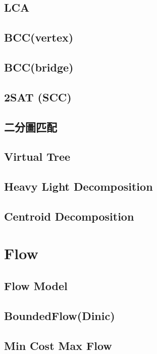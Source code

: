 \subsection{LCA}

\subsection{BCC(vertex)}

\subsection{BCC(bridge)}

\subsection{2SAT (SCC)}

\subsection{二分圖匹配}

\subsection{Virtual Tree}

\subsection{Heavy Light Decomposition}

\subsection{Centroid Decomposition}


\section{Flow}
\subsection{Flow Model}

\subsection{BoundedFlow(Dinic)}

\subsection{Min Cost Max Flow}

